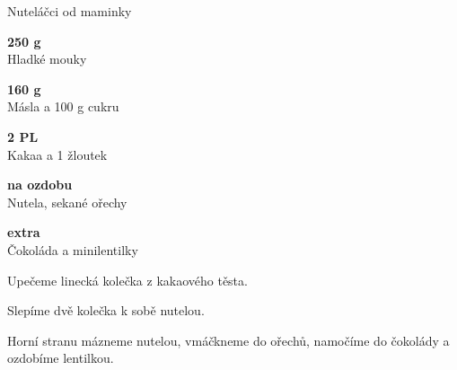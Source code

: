 \documentclass[11pt,a4paper]{article}
\begin{document}
\begin{recipe}[DarkOrchid]{Nuteláčci od maminky}
    \begin{ingredients}
        \item \parbox[t]{\linewidth}{\raggedright \weight \textbf{250 g}\\ Hladké mouky}
        \item \parbox[t]{\linewidth}{\raggedright \weight \textbf{160 g}\\ Másla a 100 g cukru}
        \item \parbox[t]{\linewidth}{\raggedright \spoon \textbf{2 PL}\\ Kakaa a 1 žloutek}
        \item \parbox[t]{\linewidth}{\raggedright \indefinite \textbf{na ozdobu}\\ Nutela, sekané ořechy}
        \item \parbox[t]{\linewidth}{\raggedright \indefinite \textbf{extra}\\ Čokoláda a minilentilky}
    \end{ingredients}
    \begin{steps}
        \item Upečeme linecká kolečka z kakaového těsta.
        \item Slepíme dvě kolečka k sobě nutelou.
        \item Horní stranu mázneme nutelou, vmáčkneme do ořechů, namočíme do čokolády a ozdobíme lentilkou.
    \end{steps}
\end{recipe}
\end{document}
